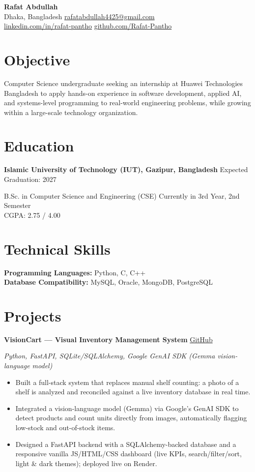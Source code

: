 \documentclass[10.5pt,a4paper]{article}
\newcommand{\heading}[2]{%
  \noindent\textbf{#1} \hfill #2\par
}
\begin{document}
\begin{center}
  {\Huge \bfseries Rafat Abdullah}\\[0.4em]
  Dhaka, Bangladesh \;\textbar{} \;\textbar\; \href{mailto:rafatabdullah4425@gmail.com}{rafatabdullah4425@gmail.com}\\[0.2em]
  \href{https://www.linkedin.com/in/rafat-pantho/}{linkedin.com/in/rafat-pantho} \;\textbar\; \href{https://github.com/Rafat-Pantho}{github.com/Rafat-Pantho}
\end{center}

\section*{Objective}
Computer Science undergraduate seeking an internship at Huawei Technologies Bangladesh to apply hands-on
experience in software development, applied AI, and systems-level programming to real-world engineering
problems, while growing within a large-scale technology organization.

\section*{Education}
\heading{Islamic University of Technology (IUT), Gazipur, Bangladesh}{Expected Graduation: 2027}
B.Sc. in Computer Science and Engineering (CSE) \hfill Currently in 3rd Year, 2nd Semester\\
CGPA: 2.75 / 4.00

\section*{Technical Skills}
\textbf{Programming Languages:} Python, C, C++\\
\textbf{Database Compatibility:} MySQL, Oracle, MongoDB, PostgreSQL

\section*{Projects}

\heading{VisionCart --- Visual Inventory Management System}{\href{https://github.com/Rafat-Pantho/VisionCart}{GitHub}}
\textit{Python, FastAPI, SQLite/SQLAlchemy, Google GenAI SDK (Gemma vision-language model)}
\begin{itemize}
  \item Built a full-stack system that replaces manual shelf counting: a photo of a shelf is analyzed and
        reconciled against a live inventory database in real time.
  \item Integrated a vision-language model (Gemma) via Google's GenAI SDK to detect products and count units
        directly from images, automatically flagging low-stock and out-of-stock items.
  \item Designed a FastAPI backend with a SQLAlchemy-backed database and a responsive vanilla JS/HTML/CSS
        dashboard (live KPIs, search/filter/sort, light \& dark themes); deployed live on Render.
\end{itemize}
\end{document}
